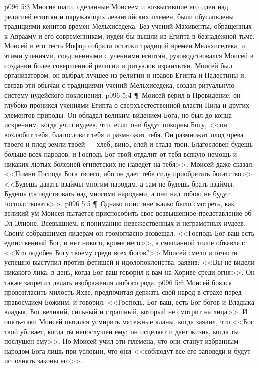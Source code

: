 \vs p096 5:3 Многие шаги, сделанные Моисеем и возвысившие его идеи над религией египтян и окружающих левантийских племен, были обусловлены традициями кенитов времен Мельхиседека. Без учений Махивенты, обращенных к Аврааму и его современникам, иудеи бы вышли из Египта в безнадежной тьме. Моисей и его тесть Иофор собрали остатки традиций времен Мельхиседека, и этими учениями, соединенными с учениями египтян, руководствовался Моисей в создании более совершенной религии и ритуалов израильтян. Моисей был организатором; он выбрал лучшее из религии и нравов Египта и Палестины и, связав эти обычаи с традициями учений Мельхиседека, создал ритуальную систему иудейского поклонения.
\vs p096 5:4 \P\ Моисей верил в Провидение; он глубоко проникся учениями Египта о сверхъестественной власти Нила и других элементов природы. Он обладал великим видением Бога, но был до конца искренним, когда учил иудеев, что, если они будут покорны Богу, <<он возлюбит тебя, благословит тебя и размножит тебя. Он размножит плод чрева твоего и плод земли твоей --- хлеб, вино, елей и стада твои. Благословен будешь больше всех народов, и Господь Бог твой отдалит от тебя всякую немощь и никаких лютых болезней египетских не наведет на тебя>>. Моисей даже сказал: <<Помни Господа Бога твоего, ибо он дает тебе силу приобретать богатство>>. <<Будешь давать взаймы многим народам, а сам не будешь брать взаймы. Будешь господствовать над многими народами, а они над тобою не будут господствовать>>.
\vs p096 5:5 \P\ Однако поистине жалко было смотреть, как великий ум Моисея пытается приспособить свое возвышенное представление об Эл\hyp{}Элионе, Всевышнем, к пониманию невежественных и неграмотных иудеев. Своим собравшимся лидерам он громогласно возвещал: <<Господь Бог ваш есть единственный Бог, и нет никого, кроме него>>, а смешанной толпе объявлял: <<Кто подобен Богу твоему среди всех богов?>> Моисей смело и отчасти успешно выступил против фетишей и идолопоклонства, заявив: <<Вы не видели никакого лика, в день, когда Бог ваш говорил к вам на Хориве среди огня>>. Он также запретил делать изображения любого рода.
\vs p096 5:6 Моисей боялся провозгласить милость Яхве, предпочитая держать свой народ в страхе перед правосудием Божиим, и говорил: <<Господь, Бог ваш, есть Бог богов и Владыка владык, Бог великий, сильный и страшный, который не смотрит на лица>>. И опять\hyp{}таки Моисей пытался усмирить мятежные кланы, когда заявил, что <<Бог твой убивает, когда ты непослушен ему; он исцеляет и дает жизнь, когда ты послушен ему>>. Но Моисей учил эти племена, что они станут избранным народом Бога лишь при условии, что они <<соблюдут все его заповеди и будут исполнять законы его>>.
